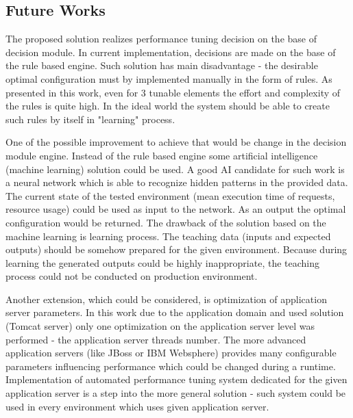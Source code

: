 \documentclass[12pt,a4paper]{article}
\begin{document}
\subsection{Future Works}

The proposed solution realizes performance tuning decision on the base of decision module. In current implementation, decisions are made on the base of the rule based engine. Such solution has main disadvantage - the desirable optimal configuration must by implemented manually in the form of rules. As presented in this work, even for 3 tunable elements the effort and complexity of the rules is quite high. In the ideal world the system should be able to create such rules by itself in "learning" process. 

One of the possible improvement to achieve that would be change in the decision module engine. Instead of the rule based engine some artificial intelligence (machine learning) solution could be used. A good AI candidate for such work is a neural network which is able to recognize hidden patterns in the provided data. The current state of the tested environment (mean execution time of requests, resource usage) could be used as input to the network. As an output the optimal configuration would be returned. The drawback of the solution based on the machine learning is learning process. The teaching data (inputs and expected outputs) should be somehow prepared for the given environment. Because during learning the generated outputs could be highly inappropriate, the teaching process could not be conducted on production environment.

Another extension, which could be considered, is optimization of application server parameters. In this work due to the application domain and used solution (Tomcat server) only one optimization on the application server level was performed - the application server threads number. The more advanced application servers (like JBoss or IBM Websphere) provides many configurable parameters influencing performance which could be changed during a runtime. Implementation of automated performance tuning system dedicated for the given application server is a step into the more general solution - such system could be used in every environment which uses given application server.  

\pagebreak
\clearpage
\end{document}
